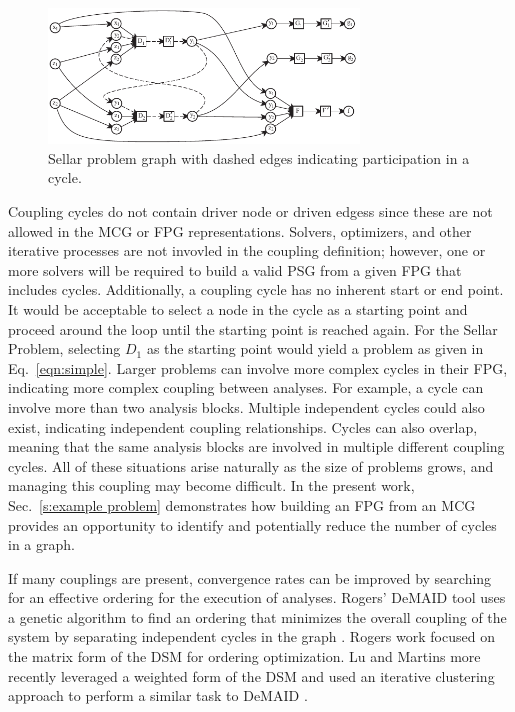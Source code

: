   \begin{figure}[htb!]
    \begin{center}
      \includegraphics[width=3.25in]{images/sellar_cycles}
    \end{center}
    \caption{Sellar problem graph with dashed edges indicating %
    participation in a cycle.\label{f:sellar cycles}}
  \end{figure} 

  Coupling cycles do not contain driver node or driven edgess since these 
  are not allowed in the MCG or FPG representations. 
  Solvers, optimizers, and other iterative processes are not invovled in the coupling 
  definition; however, one or more solvers will be required to build a valid PSG from a 
  given FPG  that includes cycles. Additionally, a coupling cycle has no inherent 
  start or end point. It would be acceptable to select a
  node in the cycle as a starting point and proceed around the
  loop until the starting point is reached again. For the Sellar Problem, selecting 
  $D_1$ as the starting point would yield a problem as given in 
  Eq.~\ref{eqn:simple}.
  Larger problems can involve more complex cycles in their FPG, indicating more 
  complex coupling between analyses. For example, a cycle can involve more than 
   two analysis blocks. Multiple independent cycles could also exist, indicating 
  independent coupling relationships. Cycles can also overlap, meaning that the same analysis 
  blocks are involved in multiple different coupling cycles. All of these situations
  arise naturally as the size of problems grows, and managing this coupling may
  become difficult. In the present work, Sec.~\ref{s:example problem}
  demonstrates how building an FPG from an MCG provides an opportunity to 
  identify and potentially reduce the number of cycles in a graph. 

  If many couplings are present, convergence rates can be improved by 
  searching for an effective ordering for the execution of analyses.
  Rogers' DeMAID tool uses a genetic algorithm to find an ordering that minimizes 
  the overall coupling of the system by separating independent cycles in the 
  graph \cite{rogers1996,rogers1996demaid}. Rogers work focused on the matrix 
  form of the DSM for ordering optimization. Lu and Martins more recently leveraged 
  a weighted form of the DSM and used an iterative clustering approach to perform a 
  similar task to DeMAID \cite{Lu2012}.

